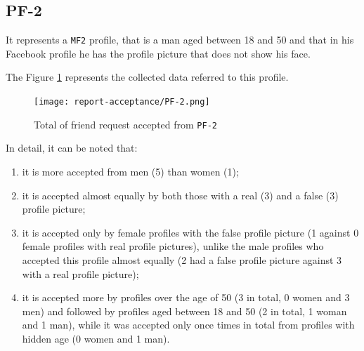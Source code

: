 \subsection*{PF-2}
It represents a \texttt{MF2} profile, that is a man aged between 18 and 50 and that in his Facebook profile he has the profile picture that does not show his face.
\par \noindent The Figure \ref{fig:accepted-from-PF2} represents the collected data referred to this profile.
\begin{figure}[H]	
	\centering
	\texttt{[image: report-acceptance/PF-2.png]} 
	\caption{Total of friend request accepted from \texttt{PF-2}}
	\label{fig:accepted-from-PF2}
\end{figure}
\par \noindent
In detail, it can be noted that:
\begin{enumerate} 
	\item it is more accepted from men (5) than women (1);
	\item it is accepted almost equally by both those with a real (3) and a false (3) profile picture;
	\item it is accepted only by female profiles with the false profile picture (1 against 0 female profiles with real profile pictures), unlike the male profiles who accepted this profile almost equally (2 had a false profile picture against 3 with a real profile picture);
	\item it is accepted more by profiles over the age of 50 (3 in total, 0 women and 3 men) and followed by profiles aged between 18 and 50 (2 in total, 1 woman and 1 man), while it was accepted only once times in total from profiles with hidden age (0 women and 1 man).
\end{enumerate}


